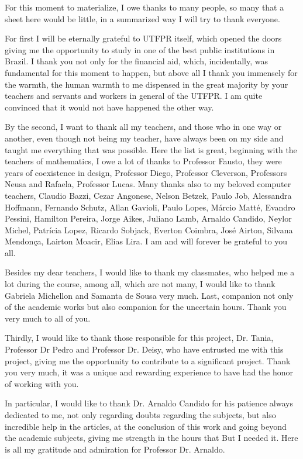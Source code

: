 For this moment to materialize, I owe thanks to many people, so many that a sheet here would be little, in a summarized way I will try to thank everyone.

For first I will be eternally grateful to UTFPR itself, which opened the doors giving me the opportunity to study in one of the best public institutions in Brazil. I thank you not only for the financial aid, which, incidentally, was fundamental for this moment to happen, but above all I thank you immensely for the warmth, the human warmth to me dispensed in the great majority by your teachers and servants and workers in general of the UTFPR. I am quite convinced that it would not have happened the other way.

By the second, I want to thank all my teachers, and those who in one way or another, even though not being my teacher, have always been on my side and taught me everything that was possible. Here the list is great, beginning with the teachers of mathematics, I owe a lot of thanks to Professor Fausto, they were years of coexistence in design, Professor Diego, Professor Cleverson, Professors Neusa and Rafaela, Professor Lucas. Many thanks also to my beloved computer teachers, Claudio Bazzi, Cezar Angonese, Nelson Betzek, Paulo Job, Alessandra Hoffmann, Fernando Schutz, Allan Gavioli, Paulo Lopes, Márcio Matté, Evandro Pessini, Hamilton Pereira, Jorge Aikes, Juliano Lamb, Arnaldo Candido, Neylor Michel, Patrícia Lopez, Ricardo Sobjack, Everton Coimbra, José Airton, Silvana Mendonça, Lairton Moacir, Elias Lira. I am and will forever be grateful to you all.

Besides my dear teachers, I would like to thank my classmates, who helped me a lot during the course, among all, which are not many, I would like to thank Gabriela Michellon and Samanta de Sousa very much. Last, companion not only of the academic works but also companion for the uncertain hours. Thank you very much to all of you.

Thirdly, I would like to thank those responsible for this project, Dr\textordfeminine. Tania, Professor Dr Pedro and Professor Dr\textordfeminine. Deisy, who have entrusted me with this project, giving me the opportunity to contribute to a significant project. Thank you very much, it was a unique and rewarding experience to have had the honor of working with you.

In particular, I would like to thank Dr. Arnaldo Candido for his patience always dedicated to me, not only regarding doubts regarding the subjects, but also incredible help in the articles, at the conclusion of this work and going beyond the academic subjects, giving me strength in the hours that But I needed it. Here is all my gratitude and admiration for Professor Dr. Arnaldo.

%
